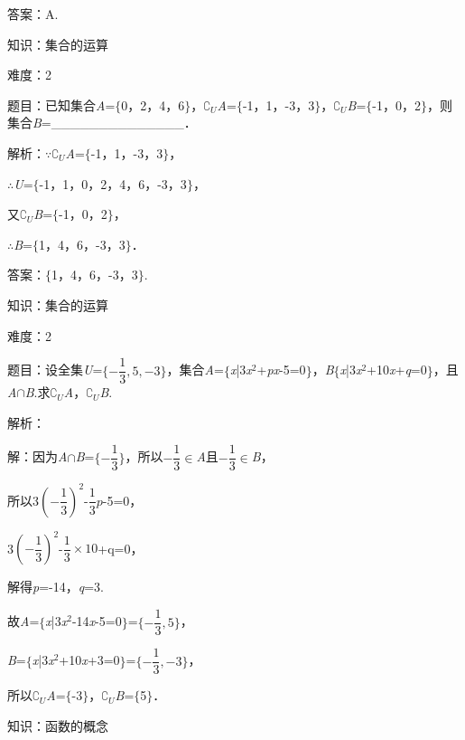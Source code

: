 \documentclass{article} %
\begin{document}
答案：A.

知识：集合的运算

难度：2

题目：已知集合\textit{A}=$\mathrm{\{}$0，2，4，6$\mathrm{\}}$，$\mathrm{\complement}$\textit{${}_{U}$A}=$\mathrm{\{}$-1，1，-3，3$\mathrm{\}}$，$\mathrm{\complement}$\textit{${}_{U}$B}=$\mathrm{\{}$-1，0，2$\mathrm{\}}$，则集合\textit{B}=\_\_\_\_\_\_\_\_\_\_\_\_\_\_．

解析：$\mathrm{\because}$$\mathrm{\complement}$\textit{${}_{U}$A}=$\mathrm{\{}$-1，1，-3，3$\mathrm{\}}$，

$\mathrm{\therefore}$\textit{U}=$\mathrm{\{}$-1，1，0，2，4，6，-3，3$\mathrm{\}}$，

又$\mathrm{\complement}$\textit{${}_{U}$B}=$\mathrm{\{}$-1，0，2$\mathrm{\}}$，

$\mathrm{\therefore}$\textit{B}=$\mathrm{\{}$1，4，6，-3，3$\mathrm{\}}$．

答案：$\mathrm{\{}$1，4，6，-3，3$\mathrm{\}}$.

知识：集合的运算

难度：2

题目：设全集\textit{U}=$\{-\dfrac{1}{3},5,-3\}$，集合\textit{A}=$\mathrm{\{}$\textit{x}|3\textit{x}${}^{2}$+\textit{px}-5=0$\mathrm{\}}$，\textit{B}$\mathrm{\{}$\textit{x}|3\textit{x}${}^{2}$+10\textit{x}+\textit{q}=0$\mathrm{\}}$，且\textit{A}$\mathrm{\cap}$\textit{B}.求$\mathrm{\complement}$\textit{${}_{U}$A}，$\mathrm{\complement}$\textit{${}_{U}$B}.

解析：

解：因为\textit{A}$\mathrm{\cap}$\textit{B}=$\{-\dfrac{1}{3}\}$，所以$-\dfrac{1}{3}\mathrm{\in}$\textit{A}且$-\dfrac{1}{3}\mathrm{\in}$\textit{B}，

所以3$(-\dfrac{1}{3})^{2}$-$\dfrac{1}{3}p$-5=0，

3$(-\dfrac{1}{3})^{2}$-$\dfrac{1}{3}\times 10$+q=0，

解得\textit{p}=-14，\textit{q}=3.

故\textit{A}=$\mathrm{\{}$\textit{x}|3\textit{x}${}^{2}$-14\textit{x}-5=0$\mathrm{\}}$=$\{-\dfrac{1}{3},5\}$，

\textit{B}=$\mathrm{\{}$\textit{x}|3\textit{x}${}^{2}$+10\textit{x}+3=0$\mathrm{\}}$=$\{-\dfrac{1}{3},-3\}$，

所以$\mathrm{\complement}$\textit{${}_{U}$A}=$\mathrm{\{}$-3$\mathrm{\}}$，$\mathrm{\complement}$\textit{${}_{U}$B}=$\mathrm{\{}$5$\mathrm{\}}$．

知识：函数的概念
\end{document}
